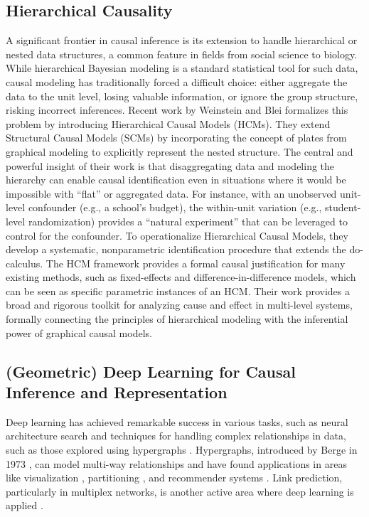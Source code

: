 {\subsection{Hierarchical Causality}
\label{subsec:hierarchical_causality}

A significant frontier in causal inference is its extension to handle hierarchical or nested data structures, a common feature in fields from social science to biology. While hierarchical Bayesian modeling is a standard statistical tool for such data, causal modeling has traditionally forced a difficult choice: either aggregate the data to the unit level, losing valuable information, or ignore the group structure, risking incorrect inferences.
Recent work by Weinstein and Blei\cite{weinstein2024hierarchical} formalizes this problem by introducing Hierarchical Causal Models (HCMs). They extend Structural Causal Models (SCMs) by incorporating the concept of plates from graphical modeling to explicitly represent the nested structure. The central and powerful insight of their work is that disaggregating data and modeling the hierarchy can enable causal identification even in situations where it would be impossible with ``flat'' or aggregated data. For instance, with an unobserved unit-level confounder (e.g., a school's budget), the within-unit variation (e.g., student-level randomization) provides a ``natural experiment'' that can be leveraged to control for the confounder.
To operationalize Hierarchical Causal Models, they develop a systematic, nonparametric identification procedure that extends the do-calculus. The HCM framework provides a formal causal justification for many existing methods, such as fixed-effects and difference-in-difference models, which can be seen as specific parametric instances of an HCM. Their work provides a broad and rigorous toolkit for analyzing cause and effect in multi-level systems, formally connecting the principles of hierarchical modeling with the inferential power of graphical causal models.

\subsection{(Geometric) Deep Learning for Causal Inference and Representation}
\label{subsec:geometric_dl_causality}

Deep learning has achieved remarkable success in various tasks, such as neural architecture search \cite{Baker2017aDesigning, Bender2018Understanding} and techniques for handling complex relationships in data, such as those explored using hypergraphs \cite{Ouvrard2020Hypergraphs, Berge1973Graphs}. Hypergraphs, introduced by Berge in 1973 \cite{Berge1973Graphs}, can model multi-way relationships and have found applications in areas like visualization \cite{Alsallakh2016State, Jacomy2014ForceAtlas2}, partitioning \cite{Catalyurek1999Hypergraph, Devine2006Parallel, Yang2017Hypergraph}, and recommender systems \cite{Zheng2018Novel, Zhou2007Learning, Wu2018Nonnegative, Jin2015Low, Zhu2015ContentBased, Zhu2016Heterogeneous}. Link prediction, particularly in multiplex networks, is another active area where deep learning is applied \cite{Potluru2020Deeplex, Zhang2018Link}.

}
